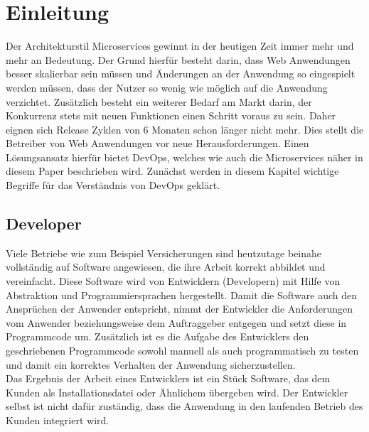 \section{Einleitung}
Der Architekturstil Microservices gewinnt in der heutigen
Zeit immer mehr und mehr an Bedeutung. Der Grund hierfür
besteht darin, dass Web Anwendungen besser skalierbar sein
müssen und Änderungen an der Anwendung so eingespielt werden
müssen, dass der Nutzer so wenig wie möglich auf die
Anwendung verzichtet. Zusätzlich besteht ein weiterer Bedarf
am Markt darin, der Konkurrenz stets mit neuen Funktionen
einen Schritt voraus zu sein. Daher eignen sich Release Zyklen
von 6 Monaten schon länger nicht mehr. Dies stellt die Betreiber
von Web Anwendungen vor neue Herausforderungen. Einen
Lösungsansatz hierfür bietet DevOps, welches wie auch die
Microservices näher in diesem Paper beschrieben wird.
Zunächst werden in diesem Kapitel wichtige Begriffe für das
Verständnis von DevOps geklärt.

\subsection{Developer}
Viele Betriebe wie zum Beispiel Versicherungen sind heutzutage beinahe vollständig auf Software angewiesen, die ihre Arbeit korrekt abbildet und vereinfacht. Diese Software wird von Entwicklern (Developern) mit Hilfe von Abstraktion und Programmiersprachen hergestellt. Damit die Software auch den Ansprüchen der Anwender entspricht, nimmt der Entwickler die Anforderungen vom Anwender beziehungsweise dem Auftraggeber entgegen und setzt diese in Programmcode um. Zusätzlich ist es die Aufgabe des Entwicklers den geschriebenen Programmcode sowohl manuell als auch programmatisch zu testen und damit ein korrektes Verhalten der Anwendung sicherzustellen.\\
Das Ergebnis der Arbeit eines Entwicklers ist ein Stück Software, das dem Kunden als Installationsdatei oder Ähnlichem übergeben wird. Der Entwickler selbst ist nicht dafür zuständig, dass die Anwendung in den laufenden Betrieb des Kunden integriert wird.

